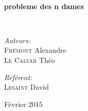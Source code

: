 \begin{titlepage}
\begin{center}





\HRule \\[0.4cm]
{ \huge \bfseries probleme des n dames \\[0.4cm] }

\HRule \\[1.5cm]

\begin{minipage}{0.4\textwidth}
\begin{flushleft} \large
\emph{Auteurs:}\\
\textsc{Frémont} Alexandre\\
\textsc{Le Calvar} Théo\\

\end{flushleft}
\end{minipage}
\begin{minipage}{0.4\textwidth}
\begin{flushright} \large
\emph{Référent:} \\
\textsc{Lesaint} David
\end{flushright}
\end{minipage}

\vfill

{\large Février 2015}

\end{center}
\end{titlepage}